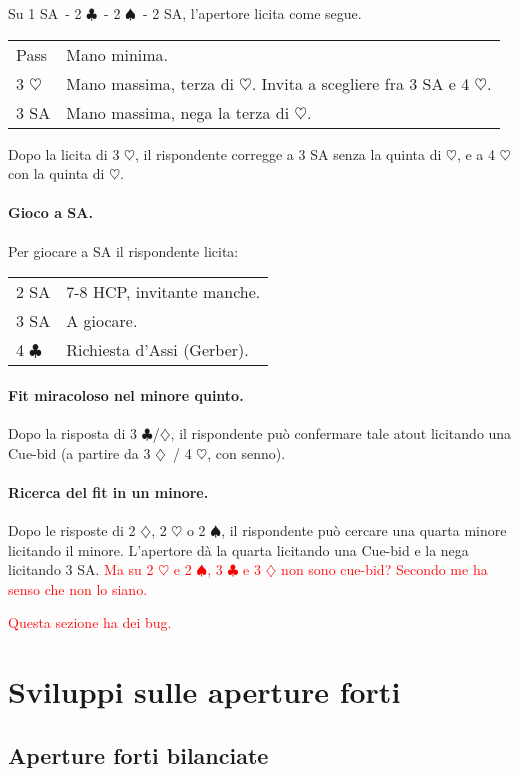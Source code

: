 \documentclass[a4paper,10pt]{article}
\renewcommand{\c}{$\clubsuit$\xspace}
\renewcommand{\d}{$\diamondsuit$\xspace}
\newcommand{\h}{$\heartsuit$\xspace}
\newcommand{\s}{$\spadesuit$\xspace}
\newcommand{\sa}{SA\xspace}
\newcommand{\smallspace}{\vskip0.3cm}
\newcommand{\note}[1]{\textcolor{red}{#1}}
\newenvironment{twocol}
  {\smallspace\noindent\begin{tabular}{l p{0.78\textwidth}}}
  {\end{tabular}\smallspace}
\begin{document}
Su 1 \sa\ - 2 \c\ - 2 \s\ - 2 \sa, l'apertore licita come segue.

\begin{twocol}
	Pass & Mano minima. \\
	3 \h & Mano massima, terza di \h. Invita a scegliere fra 3 \sa e 4 \h. \\
	3 \sa & Mano massima, nega la terza di \h. \\
\end{twocol}

Dopo la licita di 3 \h, il rispondente corregge a 3 \sa senza la quinta di \h, e a 4 \h con la quinta di \h.

\paragraph{Gioco a SA.}
Per giocare a SA il rispondente licita:
\begin{twocol}
	2 \sa & 7-8 HCP, invitante manche. \\
	3 \sa & A giocare. \\
	4 \c & Richiesta d'Assi (Gerber).
\end{twocol}

\paragraph{Fit miracoloso nel minore quinto.}
Dopo la risposta di 3 \c/\d, il rispondente può confermare tale atout licitando una Cue-bid (a partire da 3 \d\ / 4 \h, con senno).


\paragraph{Ricerca del fit in un minore.}
Dopo le risposte di 2 \d, 2 \h o 2 \s, il rispondente può cercare una quarta minore licitando il minore. L'apertore dà la quarta licitando una Cue-bid e la nega licitando 3 \sa.
\note{Ma su 2 \h e 2 \s, 3 \c e 3 \d non sono cue-bid? Secondo me ha senso che non lo siano.}

\note{Questa sezione ha dei bug.}

\pagebreak

\section{Sviluppi sulle aperture forti}


\subsection{Aperture forti bilanciate}
\end{document}
